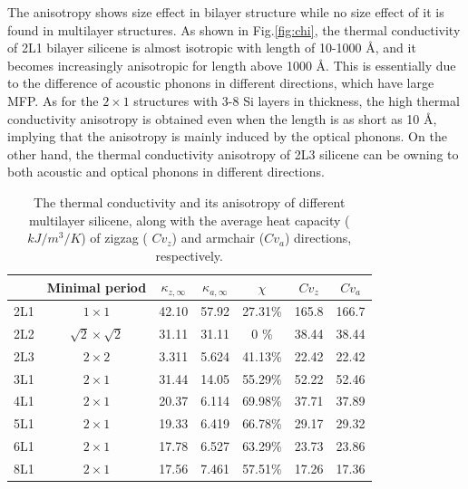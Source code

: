 \documentclass[review]{elsarticle}
\newcommand{\angstrom}{\mbox{\normalfont\AA}}
\begin{document}
The anisotropy shows size effect in bilayer structure while no size effect of it is found in multilayer structures. As shown in Fig.\ref{fig:chi}, the thermal conductivity of  2L1 bilayer silicene is almost isotropic with length of 10-1000 \angstrom, and it becomes increasingly anisotropic for length  above 1000  \angstrom. This is essentially due to the difference of acoustic phonons in different directions,  which have large MFP.  As for the $2\times1$ structures with 3-8 Si layers in thickness, the high thermal conductivity anisotropy is obtained even when the length is as short as 10 \angstrom, implying that the anisotropy is  mainly induced by the optical phonons. On the other hand, the thermal conductivity anisotropy of 2L3 silicene can be owning to both acoustic and  optical phonons in different directions.

\begin{table}
  \caption{\label{tab:table1}
    The thermal conductivity and its anisotropy of different multilayer silicene, along with the average heat capacity ($kJ/m^3/K$) of zigzag ( $Cv_z$) and armchair ($Cv_a$) directions, respectively. }

  \begin{tabular}{ccccccc}
        & Minimal period
        & $\kappa_{z,\infty}$
        & $\kappa_{a,\infty}$
        & $\chi$
        & $Cv_{z}$
        & $Cv_{a}$                                                           \\
    \hline
    2L1 & $1 \times 1$             & 42.10 & 57.92 & 27.31\% & 165.8 & 166.7 \\
    2L2 & $\sqrt{2}\times\sqrt{2}$ & 31.11 & 31.11 & 0    \% & 38.44 & 38.44 \\
    2L3 & $2 \times 2$             & 3.311 & 5.624 & 41.13\% & 22.42 & 22.42 \\
    3L1 & $2 \times 1$             & 31.44 & 14.05 & 55.29\% & 52.22 & 52.46 \\
    4L1 & $2 \times 1$             & 20.37 & 6.114 & 69.98\% & 37.71 & 37.89 \\
    5L1 & $2 \times 1$             & 19.33 & 6.419 & 66.78\% & 29.17 & 29.32 \\
    6L1 & $2 \times 1$             & 17.78 & 6.527 & 63.29\% & 23.73 & 23.86 \\
    8L1 & $2 \times 1$             & 17.56 & 7.461 & 57.51\% & 17.26 & 17.36 \\
  \end{tabular}
\end{table}
\end{document}

